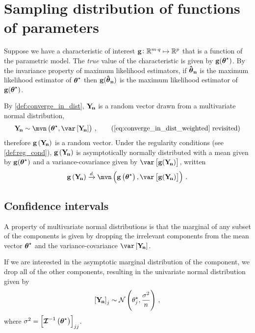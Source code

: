 \documentclass[
    11pt,
    extrafontsizes,
    article,
    oldfontcommands,
    final,
    oneside,
    openany,
    hidelinks]{memoir}
\begin{document}
\chapter{Sampling distribution of functions of parameters}
\label{sec:app}
Suppose we have a characteristic of interest $\boldsymbol{\mathbf{\operatorname{g}}} \colon \mathbb{R}^{m \cdot q} \mapsto \mathbb{R}^{p}$ that is a function of the parametric model.
The \emph{true} value of the characteristic is given by $\boldsymbol{\mathbf{\operatorname{g}}}({\boldsymbol{\mathbf{\theta}}}^{\star})$.
By the invariance property of maximum likelihood estimators, if $\boldsymbol{\mathbf{\hat{\boldsymbol{\mathbf{\theta}}}_{n}}}$ is the maximum likelihood estimator of ${\boldsymbol{\mathbf{\theta}}}^{\star}$ then $\boldsymbol{\mathbf{\operatorname{g}}}(\boldsymbol{\mathbf{\hat{\boldsymbol{\mathbf{\theta}}}_{n}}})$ is the maximum likelihood estimator of $\boldsymbol{\mathbf{\operatorname{g}}}({\boldsymbol{\mathbf{\theta}}}^{\star})$.

By \cref{def:converge_in_dist}, $\mathrm{\boldsymbol{\mathbf{Y_{\!n}}}}$ is a random vector drawn from a multivariate normal distribution,
\begin{equation*}
    \sampdu \sim \mvn\left(\tparam\sysparamvec, \var\left[\sampdu\right]\right)\,,
    \tag{\text{\ref{eq:converge_in_dist_weighted} revisited}}
\end{equation*}
therefore $\boldsymbol{\mathbf{\operatorname{g}}}\left(\mathrm{\boldsymbol{\mathbf{Y_{\!n}}}}\right)$ is a random vector. Under the regularity conditions (see \cref{def:reg_cond}), $\boldsymbol{\mathbf{\operatorname{g}}}\left(\mathrm{\boldsymbol{\mathbf{Y_{\!n}}}}\right)$ is asymptotically normally distributed with a mean given by $\boldsymbol{\mathbf{\operatorname{g}}}({\boldsymbol{\mathbf{\theta}}}^{\star})$ and a variance-covariance given by $\var\left[\vecstat(\sampdu)\right]$, written
\begin{equation}
\vecstat\left(\sampdu\right) \xrightarrow{d} \mvn\left(\vecstat\left(\tparam\sysparamvec\right), \var\left[\vecstat(\sampdu)\right]\right)\,.
\end{equation}

\section{Confidence intervals}
\label{sec:app:conf_interval}
A property of multivariate normal distributions is that the marginal of any subset of the components is given by dropping the irrelevant components from the mean vector ${\boldsymbol{\mathbf{\theta}}}^{\star}$ and the variance-covariance $\var\left[\sampdu\right]$.

If we are interested in the asymptotic marginal distribution of the \jth component, we drop all of the other components, resulting in the univariate normal distribution given by
\begin{equation}
\label{eq:normal_marg}
    \left[\mathrm{\boldsymbol{\mathbf{Y_{\!n}}}}\right]_j \sim \mathcal{N}\left({\theta}^{\star}_j, \frac{\sigma^2}{n}\right)\,,
\end{equation}
where $\sigma^2 = \left[\operatorname{\boldsymbol{\mathcal{I}}}^{-1}\left({\boldsymbol{\mathbf{\theta}}}^{\star}\right)\right]_{j j}$.
\end{document}
